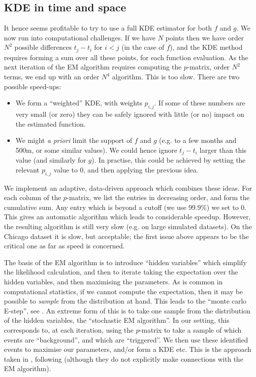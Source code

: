 \documentclass[twoside,a4paper]{article}
\theoremstyle{plain}
\theoremstyle{definition}
\begin{document}
\subsection{KDE in time and space}\label{sec:kde_time_space}

It hence seems profitable to try to use a full KDE estimator for both $f$ and $g$.
We now run into computational challenges.  If we have $N$ points then we have order $N^2$
possible differences $t_j-t_i$ for $i<j$ (in the case of $f$),
and the KDE method requires forming a sum
over all these points, for each function evaluation.  As the next iteration of the EM algorithm
requires computing the $p$-matrix, order $N^2$ terms, we end up with an order $N^4$ algorithm.
This is too slow.  There are two possible speed-ups:
\begin{itemize}
\item We form a ``weighted'' KDE, with weights $p_{i,j}$.  If some of these numbers are
very small (or zero) they can be safely ignored with little (or no) impact on the estimated
function.
\item We might \emph{a priori} limit the support of $f$ and $g$ (e.g. to a few months and 500m,
or some similar values).  We could hence ignore $t_j - t_i$ larger than this value (and similarly
for $g$).  In practise, this could be achieved by setting the relevant $p_{i,j}$ value to $0$,
and then applying the previous idea.
\end{itemize}

We implement an adaptive, data-driven approach which combines these ideas.  For each column
of the $p$-matrix, we list the entries in decreasing order, and form the cumulative sum.  Any
entry which is beyond a cutoff (we use 99.9\%) we set to 0.  This gives an automatic algorithm
which leads to considerable speedup.  However, the resulting algorithm is still very slow
(e.g. on large simulated datasets).
On the Chicago dataset it is slow, but acceptable; the first issue above appears to be the
critical one as far as speed is concerned.

The basis of the EM algorithm is to introduce ``hidden variables'' which simplify the likelihood
calculation, and then to iterate taking the expectation over the hidden variables, and then
maximising the parameters.  As is common in computational statistics, if we cannot compute the
expectation, then it may be possible to \emph{sample} from the distribution at hand.  This leads
to the ``monte carlo E-step'', see \cite[Chapter~6]{mk}.  An extreme form of this is to take one
sample from the distribution of the hidden variables, the ``stochastic EM algorithm''.  In our
setting, this corresponds to, at each iteration, using the $p$-matrix to take a sample of which
events are ``background'', and which are ``triggered''.  We then use these identified events
to maximise our parameters, and/or form a KDE etc.  This is the approach taken in \cite{sepp2},
following \cite{zovj} (although they do not explicitly make connections with the EM algorithm).
\end{document}
